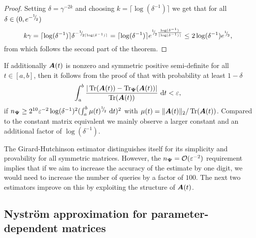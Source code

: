 \documentclass[12pt]{article}
\begin{document}
\begin{proof}
    Setting $\delta = \gamma^{-2 k}$ and choosing $k = \lceil \log(\delta^{-1}) \rceil$ we get that for all $\delta \in (0, e^{-{}^{1}{\mskip -5mu/\mskip -3mu}_{2}})$
    \begin{equation}
        k \gamma = \lceil \log(\delta^{-1}) \rceil \delta^{-{}^{1}{\mskip -5mu/\mskip -3mu}_{2\lceil \log(\delta^{-1}) \rceil}}
        = \lceil \log(\delta^{-1}) \rceil e^{{}^{1}{\mskip -5mu/\mskip -3mu}_{2}\frac{\log(\delta^{-1})}{\lceil \log(\delta^{-1}) \rceil}}
        \leq 2 \log(\delta^{-1}) e^{{}^{1}{\mskip -5mu/\mskip -3mu}_{2}},
    \end{equation}
    from which follows the second part of the theorem.
\end{proof}

\begin{remark}
    If additionally $\boldsymbol{A}(t)$ is nonzero and symmetric positive semi-definite for all $t \in [a, b]$, then it follows from the proof of  that with probability at least $1 - \delta$
    \begin{equation}
        \int_{a}^{b} \frac{| \operatorname{Tr}(\boldsymbol{A}(t)) - \operatorname{Tr}_{\boldsymbol{\Psi}}(\boldsymbol{A}(t)) |}{\operatorname{Tr}(\boldsymbol{A}(t))} ~\mathrm{d}t < \varepsilon,
    \end{equation}
    if $n_{\boldsymbol{\Psi}} \geq 2^{10} \varepsilon^{-2} \log(\delta^{-1})^2 (\int_{a}^{b} \mu(t)^{{}^{1}{\mskip -5mu/\mskip -3mu}_{2}}~\mathrm{d}t)^2$ with $\mu(t) = \lVert \boldsymbol{A}(t) \rVert _2 / \operatorname{Tr}(\boldsymbol{A}(t))$. Compared to the constant matrix equivalent \cite[remark 2]{cortinovis-2022-randomized-trace} we mainly observe a larger constant and an additional factor of $\log(\delta^{-1})$.
\end{remark}

The Girard-Hutchinson estimator distinguishes itself for its simplicity and provability for all symmetric matrices. However, the $n_{\boldsymbol{\Psi}} = \mathcal{O}(\varepsilon^{-2})$ requirement implies that if we aim to increase the accuracy of the estimate by one digit, we would need to increase the number of queries by a factor of $100$. The next two estimators improve on this by exploiting the structure of $\boldsymbol{A}(t)$.

\subsection{Nyström approximation for parameter-dependent matrices}
\label{subsec:nystrom}
\end{document}
